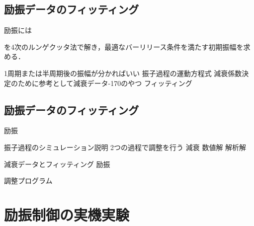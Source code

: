           \subsection{励振データのフィッティング}
            励振には
          

          



          

          
          
          
          
            を4次のルンゲクッタ法で解き，最適なバーリリース条件を満たす初期振幅を求める．
          
          


          1周期または半周期後の振幅が分かればいい
          振子過程の運動方程式
          減衰係数決定のために参考として減衰データ-170のやつ
          フィッティング


          

        \subsection{励振データのフィッティング}
        
          励振

        振子過程のシミュレーション説明
        2つの過程で調整を行う
          減衰
            数値解  
            解析解
            
            減衰データとフィッティング
          励振

          調整プログラム
        \section{励振制御の実機実験}


